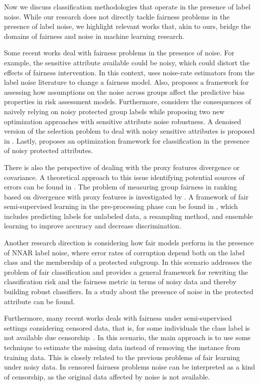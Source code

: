 Now we discuss classification methodologies that operate in the presence of label noise. While our research does not directly tackle fairness problems in the presence of label noise, we highlight relevant works that, akin to ours, bridge the domains of fairness and noise in machine learning research.

Some recent works deal with fairness problems in the presence of noise. For example, the sensitive attribute available could be noisy, which could distort the effects of fairness intervention. In this context, \cite{Lamy2019} uses noise-rate estimators from the label noise literature to change a fairness model. Also, \cite{Fogliato2020} proposes a framework for assessing how assumptions on the noise across groups affect the predictive bias properties in risk assessment models. Furthermore, \cite{Wang2020} considers the consequences of naively relying on noisy protected group labels while proposing two new optimization approaches with sensitive attribute noise robustness. A denoised version of the selection problem to deal with noisy sensitive attributes is proposed in \cite{Mehrotra2021}. Lastly, \cite{Celis2021} proposes an optimization framework for classification in the presence of noisy protected attributes.

There is also the perspective of dealing with the proxy features divergence or covariance. A theoretical approach to this issue identifying potential sources of errors can be found in \cite{Prost2021}. The problem of measuring group fairness in ranking based on divergence with proxy features is investigated by \cite{Ghazimatin2022}. A framework of fair semi-supervised learning in the pre-processing phase can be found in \cite{Zhang2022}, which includes predicting labels for unlabeled data, a resampling method, and ensemble learning to improve accuracy and decrease discrimination.

Another research direction is considering how fair models perform in the presence of NNAR label noise, where error rates of corruption depend both on the label class and the membership of a protected subgroup. In this scenario \cite{Wang2021} addresses the problem of fair classification and \cite{Wu2022} provides a general framework for rewriting the classification risk and the fairness metric in terms of noisy data and thereby building robust classifiers. In \cite{Ghosh2023} a study about the presence of noise in the protected attribute can be found.

Furthermore, many recent works deals with fairness under semi-supervised settings considering censored data, that is, for some individuals the class label is not available due censorship~\cite{WZhang2022,WZhang2023_a,WZhang2023_b,WZhang2023_c}. In this scenario, the main approach is to use some technique to estimate the missing data instead of removing the instance from training data. This is closely related to the previous problems of fair learning under noisy data. In censored fairness problems noise can be interpreted as a kind of censorship, as the original data affected by noise is not available.

